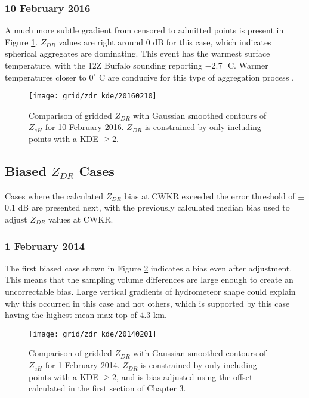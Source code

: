 \subsubsection{10 February 2016}
A much more subtle gradient from censored to admitted points is present in Figure \ref{fig:grid_zdr_kde_20160210}. $Z_{DR}$ values are right around 0 dB for this case, which indicates spherical aggregates are dominating. This event has the warmest surface temperature, with the 12Z Buffalo sounding reporting $-2.7^{\circ}$ C. Warmer temperatures closer to $0^{\circ}$ C are conducive for this type of aggregation process \citep{Hosler1957}. 
\begin{figure}[H]
\texttt{[image: grid/zdr\_kde/20160210]}
\caption{Comparison of gridded $Z_{DR}$ with Gaussian smoothed contours of $Z_{eH}$ for 10 February 2016. $Z_{DR}$ is constrained by only including points with a
KDE $\geq 2$.} 
\label{fig:grid_zdr_kde_20160210}
\end{figure}

\subsection{Biased $Z_{DR}$ Cases}
Cases where the calculated $Z_{DR}$ bias at CWKR exceeded the error threshold of $\pm$ 0.1 dB are presented next, with the previously calculated median bias used to adjust $Z_{DR}$ values at CWKR.
\subsubsection{1 February 2014}
The first biased case shown in Figure \ref{fig:grid_zdr_kde_20140201} indicates a bias even after adjustment. This means that the sampling volume differences are large enough to create an uncorrectable bias. Large vertical gradients of hydrometeor shape could explain why this occurred in this case and not others, which is supported by this case having the highest mean max top of 4.3 km. 
\begin{figure}[H]
\texttt{[image: grid/zdr\_kde/20140201]}
\caption{Comparison of gridded $Z_{DR}$ with Gaussian smoothed contours of $Z_{eH}$ for 1 February 2014. $Z_{DR}$ is constrained by only including points with a
KDE $\geq 2$, and is bias-adjusted using the offset calculated in the first section of Chapter 3.} 
\label{fig:grid_zdr_kde_20140201}
\end{figure}


